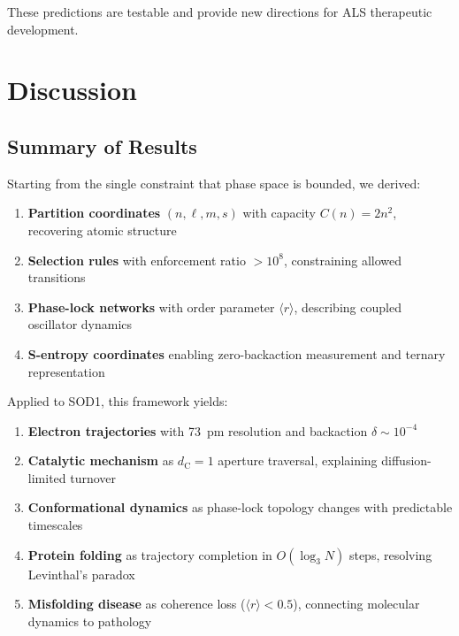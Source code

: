 \documentclass[twocolumn,aps,prx,superscriptaddress,longbibliography]{revtex4-2}
\theoremstyle{remark}
\newcommand{\dC}{d_\text{C}}
\newcommand{\orderpar}{\langle r \rangle}
\begin{document}
These predictions are testable and provide new directions for ALS
therapeutic development.

\section{Discussion}
\label{sec:discussion}

\subsection{Summary of Results}

Starting from the single constraint that phase space is bounded, we
derived:

\begin{enumerate}
    \item \textbf{Partition coordinates} $(n, \ell, m, s)$ with capacity
    $C(n) = 2n^2$, recovering atomic structure

    \item \textbf{Selection rules} with enforcement ratio $>10^8$,
    constraining allowed transitions

    \item \textbf{Phase-lock networks} with order parameter $\orderpar$,
    describing coupled oscillator dynamics

    \item \textbf{S-entropy coordinates} enabling zero-backaction
    measurement and ternary representation
\end{enumerate}

Applied to SOD1, this framework yields:

\begin{enumerate}
    \item \textbf{Electron trajectories} with 73~pm resolution and
    backaction $\delta \sim 10^{-4}$

    \item \textbf{Catalytic mechanism} as $\dC = 1$ aperture traversal,
    explaining diffusion-limited turnover

    \item \textbf{Conformational dynamics} as phase-lock topology changes
    with predictable timescales

    \item \textbf{Protein folding} as trajectory completion in
    $O(\log_3 N)$ steps, resolving Levinthal's paradox

    \item \textbf{Misfolding disease} as coherence loss ($\orderpar < 0.5$),
    connecting molecular dynamics to pathology
\end{enumerate}
\end{document}
